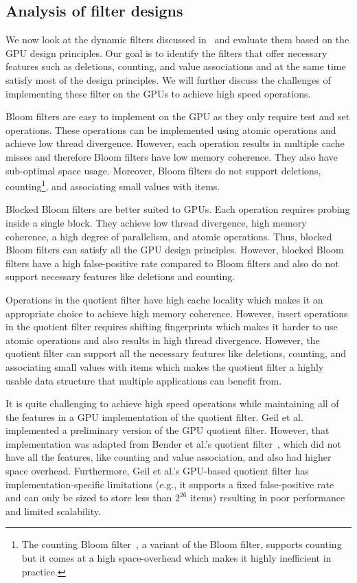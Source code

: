 \iffalse

\subsection{Analysis of filter designs}

We now look at the dynamic filters discussed in~ and evaluate
them based on the GPU design principles.  Our goal is to identify the filters
that offer necessary features such as deletions, counting, and value
associations and at the same time satisfy most of the design principles.  We
will further discuss the challenges of implementing these filter on the GPUs to
achieve high speed operations.

Bloom filters are easy to implement on the GPU as they only require test and set
operations. These operations can be implemented using atomic operations and
achieve low thread divergence. However, each operation results in multiple cache
misses and therefore Bloom filters have low memory coherence. They also have
sub-optimal space usage. Moreover, Bloom filters do not support deletions,
counting\footnote{The counting Bloom filter~\cite{FanCaAl00}, a variant of the
Bloom filter, supports counting but it comes at a high space-overhead which
makes it highly inefficient in practice.}, and associating small values with
items.

Blocked Bloom filters are better suited to GPUs.  Each operation requires
probing inside a single block. They achieve low thread divergence, high memory
coherence, a high degree of parallelism, and atomic operations. Thus, blocked
Bloom filters can satisfy all the GPU design principles. However, blocked Bloom
filters have a high false-positive rate compared to Bloom filters and also do
not support necessary features like deletions and counting.

Operations in the quotient filter have high cache locality which makes it an
appropriate choice to achieve high memory coherence. However, insert operations
in the quotient filter requires shifting fingerprints which makes it harder to
use atomic operations and also results in high thread divergence. However, the
quotient filter can support all the necessary features like deletions, counting,
and associating small values with items which makes the quotient filter a highly
usable data structure that multiple applications can benefit from.

It is quite challenging to achieve high speed operations while maintaining all
of the features in a GPU implementation of the quotient filter. Geil et
al.~\cite{Geil:2018:QFA} implemented a preliminary version of the GPU quotient filter.
However, that implementation was adapted from Bender et al.'s quotient
filter~\cite{BenderFaJo12}, which did not have all the features, like counting
and value association, and also had higher space overhead. Furthermore, Geil et
al.'s GPU-based quotient filter has implementation-specific limitations (e.g., it
supports a fixed false-positive rate and can only be sized to store less than
$2^{26}$ items) resulting in poor performance and limited scalability.

